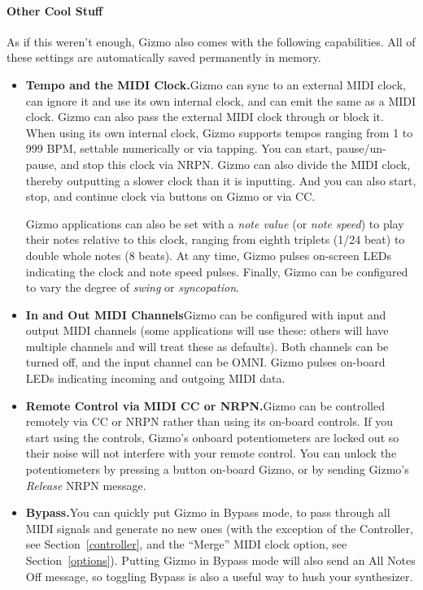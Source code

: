 \documentclass{article}
\begin{document}
\paragraph{Other Cool Stuff}

As if this weren't enough, Gizmo also comes with the following capabilities.  All of these settings are automatically saved permanently in memory.

\begin{itemize}
\item {\bf Tempo and the MIDI Clock.}\quad Gizmo can sync to an external MIDI clock, can ignore it and use its own internal clock, and can emit the same as a MIDI clock.  Gizmo can also pass the external MIDI clock through or block it.  When using its own internal clock, Gizmo supports tempos ranging from 1 to 999 BPM, settable numerically or via tapping.  You can start, pause/un-pause, and stop this clock via NRPN. Gizmo can also divide the MIDI clock, thereby outputting a slower clock than it is inputting.  And you can also start, stop, and continue clock via buttons on Gizmo or via CC.

Gizmo applications can also be set with a {\it note value} (or {\it note speed}) to play their notes relative to this clock, ranging from eighth triplets (1/24 beat) to double whole notes (8 beats).  At any time, Gizmo pulses on-screen LEDs indicating the clock and note speed pulses.  Finally, Gizmo can be configured to vary the degree of {\it swing} or {\it syncopation}.

\item {\bf In and Out MIDI Channels}\quad Gizmo can be configured with input and output MIDI channels (some applications will use these: others will have multiple channels and will treat these as defaults).  Both channels can be turned off, and the input channel can be OMNI.  Gizmo pulses on-board LEDs indicating incoming and outgoing MIDI data.  

\item {\bf Remote Control via MIDI CC or NRPN.}\quad Gizmo can be controlled remotely via CC or NRPN rather than using its on-board controls.  If you start using the controls, Gizmo's onboard potentiometers are locked out so their noise will not interfere with your remote control.  You can unlock the potentiometers by pressing a button on-board Gizmo, or by sending Gizmo's {\it Release} NRPN message.  

\item {\bf Bypass.}\quad You can quickly put Gizmo in Bypass mode, to pass through all MIDI signals and generate no new ones (with the exception of the Controller, see Section~\ref{controller}, and the ``Merge'' MIDI clock option, see Section~\ref{options}).  Putting Gizmo in Bypass mode will also send an All Notes Off message, so toggling Bypass is also a useful way to hush your synthesizer.


\end{itemize}
\end{document}
